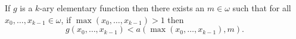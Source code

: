 If $g$ is a $k$-ary elementary function then there exists an $m \in \omega$ such that for all $x_0, \ldots, x_{k-1} \in \omega$, if $\max(x_0, \ldots, x_{k-1}) > 1$ then
$$g(x_0, \ldots, x_{k-1}) < a(\max(x_0, \ldots, x_{k-1}), m).$$